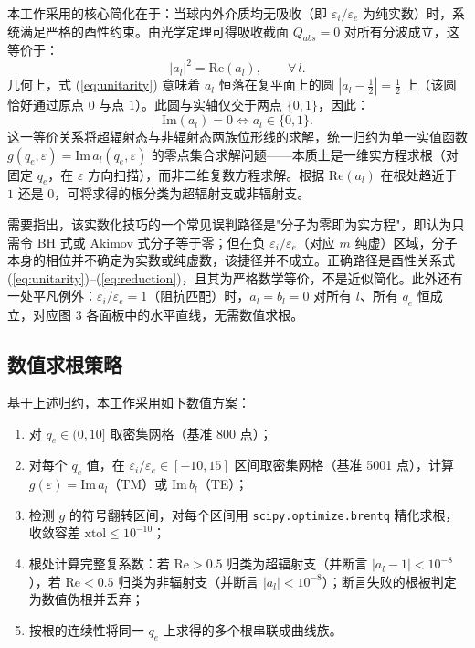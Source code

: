 \documentclass[12pt]{ctexart}
\begin{document}
本工作采用的核心简化在于：当球内外介质均无吸收（即 $\varepsilon_i/\varepsilon_e$ 为纯实数）时，系统满足严格的酉性约束。由光学定理可得吸收截面 $Q_{abs}=0$ 对所有分波成立，这等价于：
\begin{equation}
|a_l|^2 = \mathrm{Re}(a_l), \qquad \forall\, l.
\label{eq:unitarity}
\end{equation}
几何上，式 (\ref{eq:unitarity}) 意味着 $a_l$ 恒落在复平面上的圆 $|a_l - \tfrac12|=\tfrac12$ 上（该圆恰好通过原点 $0$ 与点 $1$）。此圆与实轴仅交于两点 $\{0,1\}$，因此：
\begin{equation}
\mathrm{Im}(a_l) = 0 \iff a_l \in \{0, 1\}.
\label{eq:reduction}
\end{equation}
这一等价关系将超辐射态与非辐射态两族位形线的求解，统一归约为单一实值函数 $g(q_e,\varepsilon) = \mathrm{Im}\,a_l(q_e,\varepsilon)$ 的零点集合求解问题——本质上是一维实方程求根（对固定 $q_e$，在 $\varepsilon$ 方向扫描），而非二维复数方程求解。根据 $\mathrm{Re}(a_l)$ 在根处趋近于 $1$ 还是 $0$，可将求得的根分类为超辐射支或非辐射支。

需要指出，该实数化技巧的一个常见误判路径是"分子为零即为实方程"，即认为只需令 BH 式或 Akimov 式分子等于零；但在负 $\varepsilon_i/\varepsilon_e$（对应 $m$ 纯虚）区域，分子本身的相位并不确定为实数或纯虚数，该捷径并不成立。正确路径是酉性关系式 (\ref{eq:unitarity})--(\ref{eq:reduction})，且其为严格数学等价，不是近似简化。此外还有一处平凡例外：$\varepsilon_i/\varepsilon_e=1$（阻抗匹配）时，$a_l=b_l=0$ 对所有 $l$、所有 $q_e$ 恒成立，对应图 3 各面板中的水平直线，无需数值求根。

\subsection{数值求根策略}

基于上述归约，本工作采用如下数值方案：

\begin{enumerate}
  \item 对 $q_e \in (0, 10]$ 取密集网格（基准 800 点）；
  \item 对每个 $q_e$ 值，在 $\varepsilon_i/\varepsilon_e \in [-10, 15]$ 区间取密集网格（基准 5001 点），计算 $g(\varepsilon) = \mathrm{Im}\,a_l$（TM）或 $\mathrm{Im}\,b_l$（TE）；
  \item 检测 $g$ 的符号翻转区间，对每个区间用 \texttt{scipy.optimize.brentq} 精化求根，收敛容差 $\mathrm{xtol}\le 10^{-10}$；
  \item 根处计算完整复系数：若 $\mathrm{Re}>0.5$ 归类为超辐射支（并断言 $|a_l-1|<10^{-8}$），若 $\mathrm{Re}<0.5$ 归类为非辐射支（并断言 $|a_l|<10^{-8}$）；断言失败的根被判定为数值伪根并丢弃；
  \item 按根的连续性将同一 $q_e$ 上求得的多个根串联成曲线族。
\end{enumerate}
\end{document}

